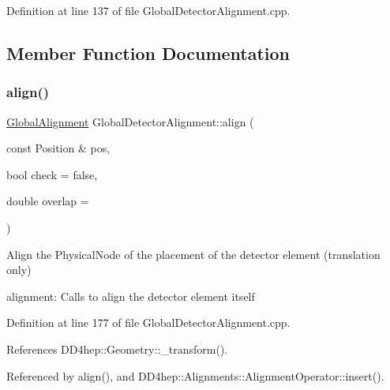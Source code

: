 Definition at line 137 of file Global\+Detector\+Alignment.\+cpp.



\subsection{Member Function Documentation}
\hypertarget{class_d_d4hep_1_1_alignments_1_1_global_detector_alignment_a5423eff6a3f3a03fc45c6563d82ee256}{}\label{class_d_d4hep_1_1_alignments_1_1_global_detector_alignment_a5423eff6a3f3a03fc45c6563d82ee256} 
\subsubsection{\texorpdfstring{align()}{align()}\hspace{0.1cm}{\footnotesize\ttfamily [1/10]}}
{\footnotesize\ttfamily \hyperlink{class_d_d4hep_1_1_alignments_1_1_global_alignment}{Global\+Alignment} Global\+Detector\+Alignment\+::align (\begin{DoxyParamCaption}\item[{const Position \&}]{pos,  }\item[{bool}]{check = {\ttfamily false},  }\item[{double}]{overlap = {} }\end{DoxyParamCaption})}



Align the Physical\+Node of the placement of the detector element (translation only) 

alignment\+: Calls to align the detector element itself 

Definition at line 177 of file Global\+Detector\+Alignment.\+cpp.



References D\+D4hep\+::\+Geometry\+::\+\_\+transform().



Referenced by align(), and D\+D4hep\+::\+Alignments\+::\+Alignment\+Operator\+::insert().

\hypertarget{class_d_d4hep_1_1_alignments_1_1_global_detector_alignment_ae865aabbab6f92bff3bc6dd8c10898fc}{}\label{class_d_d4hep_1_1_alignments_1_1_global_detector_alignment_ae865aabbab6f92bff3bc6dd8c10898fc} 
